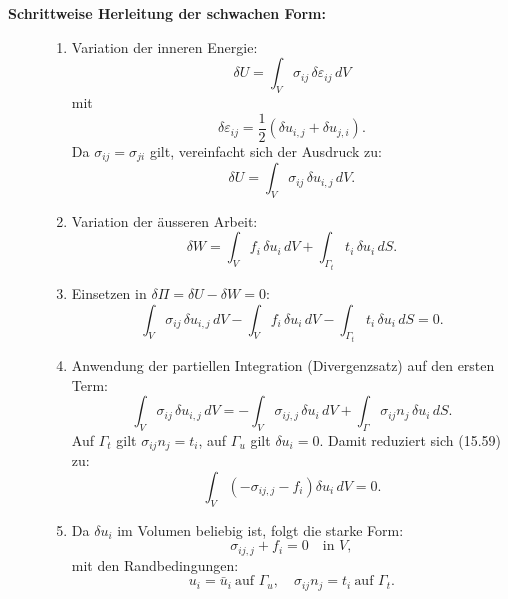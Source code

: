 \begin{description}
	\item[\textbf{Schrittweise Herleitung der schwachen Form:}]
	\begin{enumerate}
		\item Variation der inneren Energie:
		\begin{equation}
			\delta U = 
			\int_V \sigma_{ij} \, \delta \varepsilon_{ij} \, dV
		\end{equation}
		mit
		\begin{equation}
			\delta \varepsilon_{ij} = 
			\frac{1}{2} \left( \delta u_{i,j} + \delta u_{j,i} \right).
		\end{equation}
		Da $\sigma_{ij} = \sigma_{ji}$ gilt, vereinfacht sich der Ausdruck zu:
		\begin{equation}
			\delta U = 
			\int_V \sigma_{ij} \, \delta u_{i,j} \, dV.
		\end{equation}
		
		\item Variation der äusseren Arbeit:
		\begin{equation}
			\delta W = 
			\int_V f_i \, \delta u_i \, dV + \int_{\Gamma_t} t_i \, \delta u_i \, dS.
		\end{equation}
		
		\item Einsetzen in $\delta\Pi = \delta U - \delta W = 0$:
		\begin{equation}
			\int_V \sigma_{ij} \, \delta u_{i,j} \, dV - \int_V f_i \, \delta u_i \, dV - \int_{\Gamma_t} t_i \, \delta u_i \, dS = 
			0.
			\label{eq:pvw}
		\end{equation}
		
		\item Anwendung der partiellen Integration (Divergenzsatz) auf den ersten Term:
		\begin{equation}
			\int_V \sigma_{ij} \, \delta u_{i,j} \, dV 
			= -\int_V \sigma_{ij,j} \, \delta u_i \, dV + \int_{\Gamma} \sigma_{ij} n_j \, \delta u_i \, dS.
		\end{equation}
		Auf $\Gamma_t$ gilt $\sigma_{ij} n_j = t_i$, auf $\Gamma_u$ gilt $\delta u_i = 0$. 
		Damit reduziert sich (15.59) zu:
		\begin{equation}
			\int_V \left( -\sigma_{ij,j} - f_i \right) \delta u_i \, dV = 
			0.
		\end{equation}
		
		\item Da $\delta u_i$ im Volumen beliebig ist, folgt die starke Form:
		\begin{equation}
			\sigma_{ij,j} + f_i = 
			0 \quad \text{in } V,
		\end{equation}
		mit den Randbedingungen:
		\begin{equation}
			u_i = \bar u_i \ \text{auf } \Gamma_u, \quad \sigma_{ij} n_j =
			t_i \ \text{auf } \Gamma_t.
		\end{equation}
	\end{enumerate}
\end{description}
